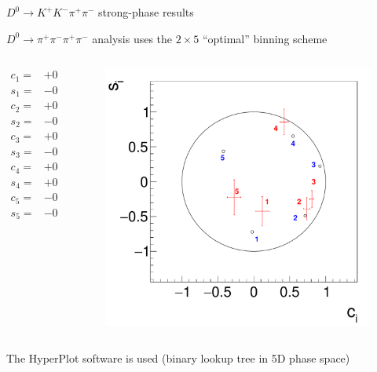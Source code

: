 \documentclass[xcolor={dvipsnames}]{beamer}
\begin{document}
\begin{frame}{$D^0\to K^+K^-\pi^+\pi^-$ strong-phase results}
  \begin{center}
    $D^0\to\pi^+\pi^-\pi^+\pi^-$ analysis uses the $2\times5$ ``optimal'' binning scheme
  \end{center}
  \vspace{0.0cm}
  \begin{columns}
    \begin{column}{0.5\textwidth}
      \vspace{-0.5cm}
      \begin{align*}
        c_1 =& +0.12 \pm 0.09 \pm 0.02 \\
        s_1 =& -0.42 \pm 0.21 \pm 0.04 \\
        c_2 =& +0.74 \pm 0.04 \pm 0.02 \\
        s_2 =& -0.39 \pm 0.16 \pm 0.06 \\
        c_3 =& +0.81 \pm 0.03 \pm 0.01 \\
        s_3 =& -0.25 \pm 0.12 \pm 0.03 \\
        c_4 =& +0.42 \pm 0.06 \pm 0.02 \\
        s_4 =& +0.86 \pm 0.19 \pm 0.07 \\
        c_5 =& -0.27 \pm 0.09 \pm 0.03 \\
        s_5 =& -0.22 \pm 0.25 \pm 0.08
      \end{align*}
    \end{column}
    \begin{column}{0.5\textwidth}
      \begin{figure}
        \centering
        \includegraphics[width=1.0\textwidth]{Plots/CiSiOptim.pdf}
      \end{figure}
    \end{column}
  \end{columns}
  \begin{center}
    The HyperPlot software is used (binary lookup tree in 5D phase space)
  \end{center}
\end{frame}
\end{document}
